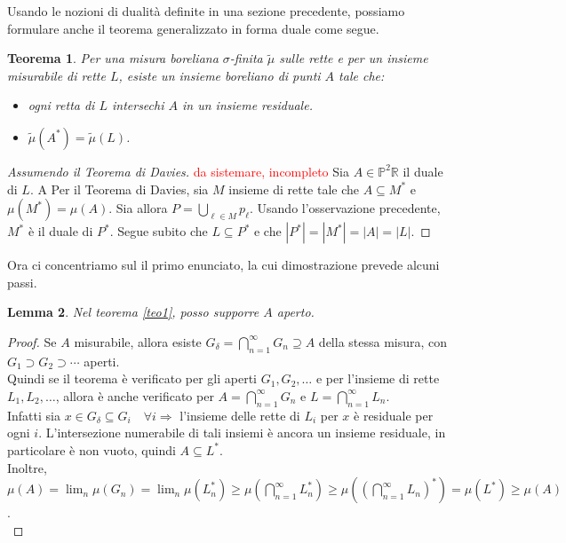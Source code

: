 \documentclass[a4paper, twoside,openright]{article}
\newcommand{\Ra}{\Rightarrow}
\newcommand{\R}{\mathbb{R}}
\renewcommand{\P}{\mathbb{P}}
\newcommand{\fa}{\forall}
\newcommand{\<}{\langle}
\renewcommand{\>}{\rangle}
\newtheorem{teo}{Teorema}[]
\newtheorem{lemma}[teo]{Lemma}
\begin{document}
Usando le nozioni di dualità definite in una sezione precedente, possiamo formulare anche il teorema generalizzato in forma duale come segue.

\begin{teo}
	Per una misura boreliana $\sigma$-finita $\tilde \mu$ sulle rette e per un insieme misurabile di rette $L$, esiste un insieme boreliano di punti $A$ tale che:
	\begin{itemize}
		\item ogni retta di $L$ intersechi $A$ in un insieme residuale.
		\item $\tilde \mu\left(A^{*}\right)=\tilde \mu(L)$.
	\end{itemize}
\end{teo}

\begin{proof}[Assumendo il Teorema di Davies]
	\textcolor{red}{da sistemare, incompleto}
	Sia $A \in \P^2\R$ il duale di $L$. A  Per il Teorema di Davies, sia $M$ insieme di rette tale che $A \subseteq M^*$ e $\mu(M^*)=\mu(A)$. Sia allora $P = \bigcup_{\ell\in M}p_\ell$. Usando l'osservazione precedente, $M^*$ è il duale di $P^*$. Segue subito che $L \subseteq P^*$ e che $|P^*|=|M^*|=|A|=|L|$.
\end{proof}

Ora ci concentriamo sul il primo enunciato, la cui dimostrazione prevede alcuni passi.

\begin{lemma} \label{Aaperto}
	Nel teorema \ref{teo1}, posso supporre $A$ aperto.
\end{lemma}

\begin{proof}
	Se $A$ misurabile, allora esiste $G_{\delta} = \bigcap_{n=1}^{\infty} G_{n} \supseteq A$ della stessa misura, con $G_{1} \supset G_{2} \supset \cdots$ aperti.\\
	Quindi se il teorema è verificato per gli aperti $G_{1}, G_{2}, \ldots$ e per l'insieme di rette $L_{1}, L_{2}, \ldots$, allora è anche verificato per  $A=\bigcap_{n=1}^{\infty} G_{n}$ e $L=\bigcap_{n=1}^{\infty} L_{n}$.\\
	Infatti sia $x \in G_{\delta} \subseteq G_i \quad \fa i \Ra$ l'insieme delle rette di $L_i$ per $x$ è residuale per ogni $i$. L'intersezione numerabile di tali insiemi è ancora un insieme residuale, in particolare è non vuoto, quindi $A \subseteq L^*$.\\
	Inoltre, $\mu(A) = \lim_n \mu(G_n) = \lim_n \mu(L_n^*) \geq \mu\left(\bigcap_{n=1}^\infty L_n^*\right) \geq \mu\left(\left(\bigcap_{n=1}^\infty L_n\right)^*\right) = \mu(L^*) \geq \mu(A)$. \\
\end{proof}
\end{document}
